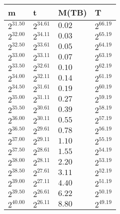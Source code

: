 \begin{tabular}{llll}
m & t & M(TB) & T \\ \hline
$2^{31.50}$ & $2^{34.61}$ & $0.02$ & $2^{66.19}$ \\
$2^{32.00}$ & $2^{34.11}$ & $0.03$ & $2^{65.19}$ \\
$2^{32.50}$ & $2^{33.61}$ & $0.05$ & $2^{64.19}$ \\
$2^{33.00}$ & $2^{33.11}$ & $0.07$ & $2^{63.19}$ \\
$2^{33.50}$ & $2^{32.61}$ & $0.10$ & $2^{62.19}$ \\
$2^{34.00}$ & $2^{32.11}$ & $0.14$ & $2^{61.19}$ \\
$2^{34.50}$ & $2^{31.61}$ & $0.19$ & $2^{60.19}$ \\
$2^{35.00}$ & $2^{31.11}$ & $0.27$ & $2^{59.19}$ \\
$2^{35.50}$ & $2^{30.61}$ & $0.39$ & $2^{58.19}$ \\
$2^{36.00}$ & $2^{30.11}$ & $0.55$ & $2^{57.19}$ \\
$2^{36.50}$ & $2^{29.61}$ & $0.78$ & $2^{56.19}$ \\
$2^{37.00}$ & $2^{29.11}$ & $1.10$ & $2^{55.19}$ \\
$2^{37.50}$ & $2^{28.61}$ & $1.55$ & $2^{54.19}$ \\
$2^{38.00}$ & $2^{28.11}$ & $2.20$ & $2^{53.19}$ \\
$2^{38.50}$ & $2^{27.61}$ & $3.11$ & $2^{52.19}$ \\
$2^{39.00}$ & $2^{27.11}$ & $4.40$ & $2^{51.19}$ \\
$2^{39.50}$ & $2^{26.61}$ & $6.22$ & $2^{50.19}$ \\
$2^{40.00}$ & $2^{26.11}$ & $8.80$ & $2^{49.19}$ \\
\end{tabular}
 \ 
